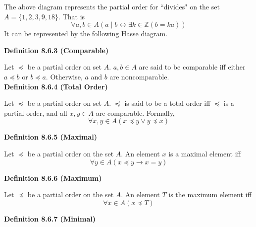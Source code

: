 \documentclass[a4paper]{article}
\makeatletter
\newcommand{\subheading}[1]{{\scriptsize\textbf{#1}}}
\newcommand\divides{\;|\;}
\def\tikzscale{1}\begin{lrbox}{\measure@tikzpicture}%
\edef\tikzscale{\pgfmathresult}%
\makeatother
\begin{document}
\begin{multicols*}{4}
The above diagram represents the partial order for ``divides" on the set $A=\{1,
2, 3, 9, 18\}$. That is
$$\forall a, b \in A (a \divides b \longleftrightarrow \exists k \in
\mathbb{Z}(b=ka))$$
It can be represented by the following Hasse diagram.

\begin{center}
\begin{scaletikzpicturetowidth}{0.8\columnwidth}
\end{scaletikzpicturetowidth}
\end{center}

\subheading{Definition 8.6.3 (Comparable)}

Let $\preceq$ be a partial order on set $A$. $a, b \in A$ are said to be
comparable iff either $a \preceq b$ or $b \preceq a$. Otherwise, $a$ and $b$ are
noncomparable. \\

\subheading{Definition 8.6.4 (Total Order)}

Let $\preceq$ be a partial order on set $A$. $\preceq$ is said to be a total
order iff $\preceq$ is a partial order, and all $x, y \in A$ are comparable.
Formally,
$$\forall x, y \in A(x \preceq y \lor y \preceq x)$$

\subheading{Definition 8.6.5 (Maximal)}

Let $\preceq$ be a partial order on the set $A$. An element $x$ is a maximal
element iff $$\forall y \in A (x \preceq y \rightarrow x = y)$$

\subheading{Definition 8.6.6 (Maximum)}

Let $\preceq$ be a partial order on the set $A$. An element $T$ is the maximum
element iff $$\forall x \in A (x \preceq T)$$

\subheading{Definition 8.6.7 (Minimal)}


\end{multicols*}
\end{document}

